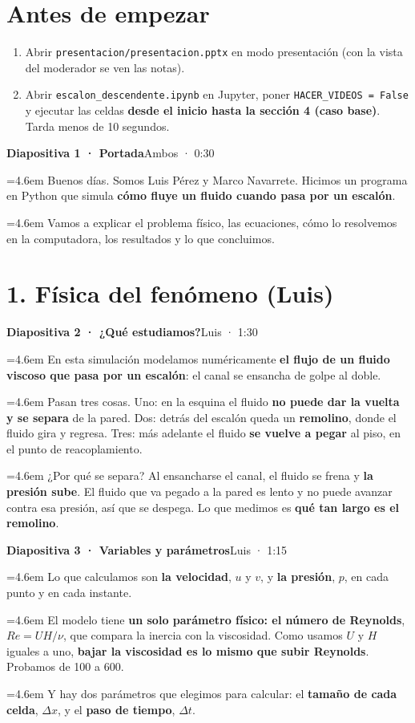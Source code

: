 \documentclass[11pt,letterpaper]{article}
\newcommand{\habla}[3]{\par\noindent\hangindent=4.6em\hangafter=1%
  \makebox[4.6em][l]{\textbf{\textcolor{#1}{#2:}}}#3\par\medskip}
\newcommand{\luis}[1]{\habla{marino}{Luis}{#1}}
\newcommand{\marco}[1]{\habla{verde}{Marco}{#1}}
\newcommand{\accion}[1]{\par\noindent{\small\itshape\color{gray}[#1]}\par\medskip}
\newcommand{\diapo}[3]{\vspace{0.5em}\par\noindent\colorbox{fondo}{\parbox{\dimexpr\linewidth-2\fboxsep}{%
  \textbf{\color{marino}Diapositiva #1 · #2}\hfill{\small #3}}}\par\medskip}
\begin{document}
\section*{Antes de empezar}
\begin{enumerate}
  \item Abrir \texttt{presentacion/presentacion.pptx} en modo presentación (con la vista del moderador se ven las notas).
  \item Abrir \texttt{escalon\_descendente.ipynb} en Jupyter, poner \texttt{HACER\_VIDEOS = False} y ejecutar las celdas
    \textbf{desde el inicio hasta la sección 4 (caso base)}. Tarda menos de 10 segundos.
\end{enumerate}

\diapo{1}{Portada}{Ambos · 0:30}
\luis{Buenos días. Somos Luis Pérez y Marco Navarrete. Hicimos un programa en Python que simula \textbf{cómo fluye un
fluido cuando pasa por un escalón}.}
\marco{Vamos a explicar el problema físico, las ecuaciones, cómo lo resolvemos en la computadora, los resultados y lo que
concluimos.}

\section*{1. Física del fenómeno (Luis)}
\diapo{2}{¿Qué estudiamos?}{Luis · 1:30}
\luis{En esta simulación modelamos numéricamente \textbf{el flujo de un fluido viscoso que pasa por un escalón}: el canal
se ensancha de golpe al doble.}
\accion{Señalar la figura.}
\luis{Pasan tres cosas. Uno: en la esquina el fluido \textbf{no puede dar la vuelta y se separa} de la pared. Dos: detrás
del escalón queda un \textbf{remolino}, donde el fluido gira y regresa. Tres: más adelante el fluido \textbf{se vuelve a
pegar} al piso, en el punto de reacoplamiento.}
\luis{¿Por qué se separa? Al ensancharse el canal, el fluido se frena y \textbf{la presión sube}. El fluido que va pegado a
la pared es lento y no puede avanzar contra esa presión, así que se despega. Lo que medimos es \textbf{qué tan largo es el
remolino}.}

\diapo{3}{Variables y parámetros}{Luis · 1:15}
\luis{Lo que calculamos son \textbf{la velocidad}, $u$ y $v$, y \textbf{la presión}, $p$, en cada punto y en cada instante.}
\luis{El modelo tiene \textbf{un solo parámetro físico: el número de Reynolds}, $\mathit{Re}=UH/\nu$, que compara la
inercia con la viscosidad. Como usamos $U$ y $H$ iguales a uno, \textbf{bajar la viscosidad es lo mismo que subir
Reynolds}. Probamos de 100 a 600.}
\luis{Y hay dos parámetros que elegimos para calcular: el \textbf{tamaño de cada celda}, $\Delta x$, y el \textbf{paso de
tiempo}, $\Delta t$.}
\end{document}
